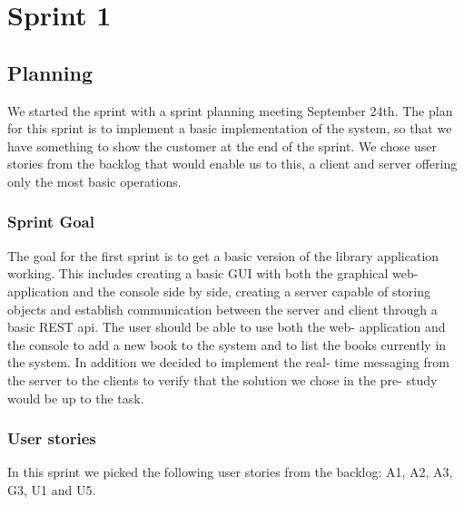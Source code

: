 \chapter{Sprint 1}
\section{Planning}
We started the sprint with a sprint planning meeting September 24th. The plan for this sprint is to implement a basic implementation of the system, so that we have something to show the customer at the end of the sprint. We chose user stories from the backlog that would enable us to this, a client and server offering only the most basic operations. 

\subsection{Sprint Goal}
The goal for the first sprint is to get a basic version of the library application working. This includes creating a basic GUI with both the graphical web- application and the console side by side, creating a server capable of storing objects and establish communication between the server and client through a basic REST api. The user should be able to use both the web- application and the console to add a new book to the system and to list the books currently in the system. In addition we decided to implement the real- time messaging from the server to the clients to verify that the solution we chose in the pre- study would be up to the task.

\subsection{User stories}
In this sprint we picked the following user stories from the backlog: A1, A2, A3, G3, U1 and U5. 

